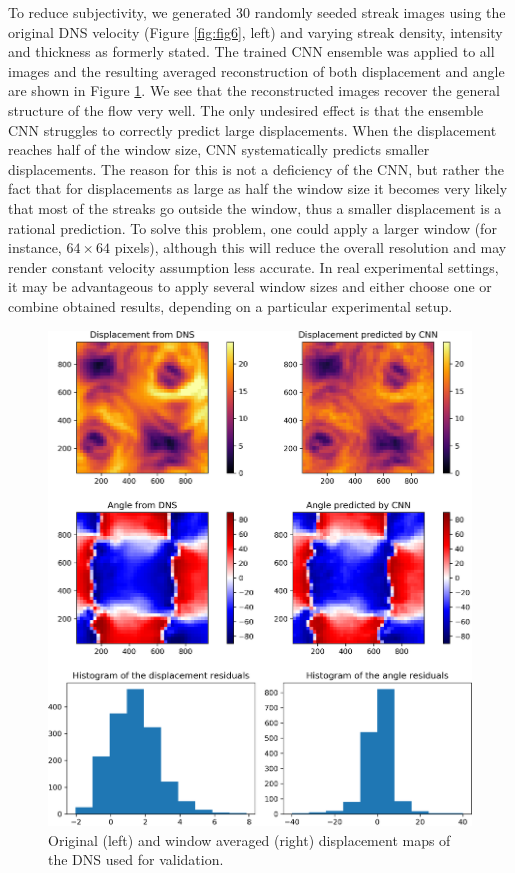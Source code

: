 \documentclass{svjour3}                     %
\begin{document}
To reduce subjectivity, we generated 30 randomly seeded streak images using the original DNS velocity (Figure \ref{fig:fig6}, left) and varying streak density, intensity and thickness as formerly stated. The trained CNN ensemble was applied to all images and the resulting averaged reconstruction of both displacement and angle are shown in Figure \ref{fig:fig7}. We see that the reconstructed images recover the general structure of the flow very well. The only undesired effect is that the ensemble CNN struggles to correctly predict large displacements. When the displacement reaches half of the window size, CNN systematically predicts smaller displacements. The reason for this is not a deficiency of the CNN, but rather the fact that for displacements as large as half the window size it becomes very likely that most of the streaks go outside the window, thus a smaller displacement is a rational prediction. To solve this problem, one could apply a larger window (for instance, $64\times 64$ pixels), although this will reduce the overall resolution and may render constant velocity assumption less accurate. In real experimental settings, it may be advantageous to apply several window sizes and either choose one or combine obtained results, depending on a particular experimental setup.

\begin{figure}
\includegraphics[width=\textwidth]{figs/figure6.png}
\caption{Original (left) and window averaged (right) displacement maps of the DNS \cite{plumley2016effects} used for validation.}
\label{fig:fig7}
\end{figure}
\end{document}
